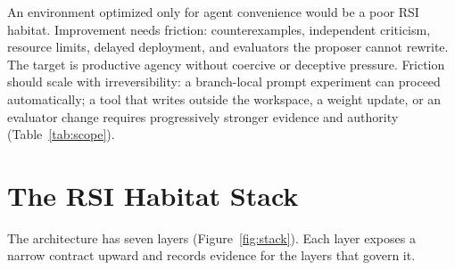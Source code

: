 \documentclass[11pt,a4paper]{article}
\begin{document}
An environment optimized only for agent convenience would be a poor RSI habitat. Improvement needs friction: counterexamples, independent criticism, resource limits, delayed deployment, and evaluators the proposer cannot rewrite. The target is productive agency without coercive or deceptive pressure. Friction should scale with irreversibility: a branch-local prompt experiment can proceed automatically; a tool that writes outside the workspace, a weight update, or an evaluator change requires progressively stronger evidence and authority (Table~\ref{tab:scope}).

\section{The RSI Habitat Stack}\label{sec:stack}

The architecture has seven layers (Figure~\ref{fig:stack}). Each layer exposes a narrow contract upward and records evidence for the layers that govern it.
\end{document}
